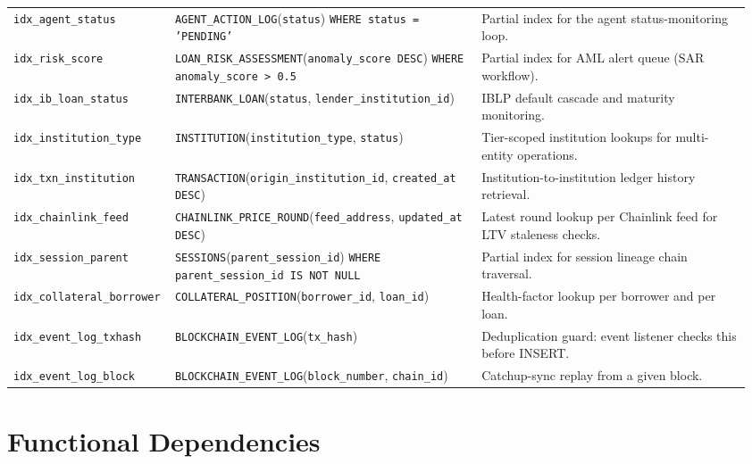 \documentclass[12pt,a4paper]{report}
\begin{document}
\begin{table}[H]
\begin{tabular}{@{}%
  >{\raggedright\arraybackslash}p{0.19\linewidth}%
  >{\raggedright\arraybackslash}p{0.41\linewidth}%
  >{\raggedright\arraybackslash}p{0.36\linewidth}@{}}
\texttt{idx\_agent\_status} &
  \texttt{AGENT\_ACTION\_LOG}(\texttt{status})\newline
  \texttt{WHERE status = 'PENDING'} &
  Partial index for the agent status-monitoring loop. \\
\texttt{idx\_risk\_score} &
  \texttt{LOAN\_RISK\_ASSESSMENT}(\texttt{anomaly\_score DESC})\newline
  \texttt{WHERE anomaly\_score > 0.5} &
  Partial index for AML alert queue (SAR workflow). \\
\texttt{idx\_ib\_loan\_status} &
  \texttt{INTERBANK\_LOAN}(\texttt{status}, \texttt{lender\_institution\_id}) &
  IBLP default cascade and maturity monitoring. \\
\texttt{idx\_institution\_type} &
  \texttt{INSTITUTION}(\texttt{institution\_type}, \texttt{status}) &
  Tier-scoped institution lookups for multi-entity operations. \\
\texttt{idx\_txn\_institution} &
  \texttt{TRANSACTION}(\texttt{origin\_institution\_id}, \texttt{created\_at DESC}) &
  Institution-to-institution ledger history retrieval. \\
\texttt{idx\_chainlink\_feed} &
  \texttt{CHAINLINK\_PRICE\_ROUND}(\texttt{feed\_address},\newline
  \texttt{updated\_at DESC}) &
  Latest round lookup per Chainlink feed for LTV staleness checks. \\
\texttt{idx\_session\_parent} &
  \texttt{SESSIONS}(\texttt{parent\_session\_id})\newline
  \texttt{WHERE parent\_session\_id IS NOT NULL} &
  Partial index for session lineage chain traversal. \\
\texttt{idx\_collateral\_borrower} &
  \texttt{COLLATERAL\_POSITION}(\texttt{borrower\_id}, \texttt{loan\_id}) &
  Health-factor lookup per borrower and per loan. \\
\texttt{idx\_event\_log\_txhash} &
  \texttt{BLOCKCHAIN\_EVENT\_LOG}(\texttt{tx\_hash}) &
  Deduplication guard: event listener checks this before INSERT. \\
\texttt{idx\_event\_log\_block} &
  \texttt{BLOCKCHAIN\_EVENT\_LOG}(\texttt{block\_number}, \texttt{chain\_id}) &
  Catchup-sync replay from a given block. \\
\bottomrule
\end{tabular}
\endgroup
\end{table}

\section{Functional Dependencies}
\end{document}
